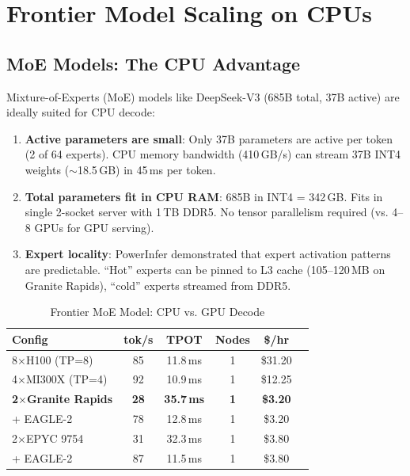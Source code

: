 \documentclass[conference,10pt]{IEEEtran}
\begin{document}
\section{Frontier Model Scaling on CPUs}
\label{sec:frontier}

\subsection{MoE Models: The CPU Advantage}

Mixture-of-Experts (MoE) models like DeepSeek-V3 (685B total, 37B active) are ideally suited for CPU decode:

\begin{enumerate}
\item \textbf{Active parameters are small}: Only 37B parameters are active per token (2 of 64 experts). CPU memory bandwidth (410\,GB/s) can stream 37B INT4 weights ($\sim$18.5\,GB) in 45\,ms per token.
\item \textbf{Total parameters fit in CPU RAM}: 685B in INT4 = 342\,GB. Fits in single 2-socket server with 1\,TB DDR5. No tensor parallelism required (vs. 4--8 GPUs for GPU serving).
\item \textbf{Expert locality}: PowerInfer demonstrated that expert activation patterns are predictable. ``Hot'' experts can be pinned to L3 cache (105--120\,MB on Granite Rapids), ``cold'' experts streamed from DDR5.
\end{enumerate}

\begin{table}[!htbp]
\caption{Frontier MoE Model: CPU vs. GPU Decode}
\label{tab:moe}
\centering\footnotesize
\begin{tabular}{@{}lccccc@{}}
\toprule
\textbf{Config} & \textbf{tok/s} & \textbf{TPOT} & \textbf{Nodes} & \textbf{\$/hr} \\
\midrule
8$\times$H100 (TP=8) & 85 & 11.8\,ms & 1 & \$31.20 \\
4$\times$MI300X (TP=4) & 92 & 10.9\,ms & 1 & \$12.25 \\
\textbf{2$\times$Granite Rapids} & \textbf{28} & \textbf{35.7\,ms} & \textbf{1} & \textbf{\$3.20} \\
\quad + EAGLE-2 & 78 & 12.8\,ms & 1 & \$3.20 \\
2$\times$EPYC 9754 & 31 & 32.3\,ms & 1 & \$3.80 \\
\quad + EAGLE-2 & 87 & 11.5\,ms & 1 & \$3.80 \\
\bottomrule
\end{tabular}
\end{table}
\end{document}
